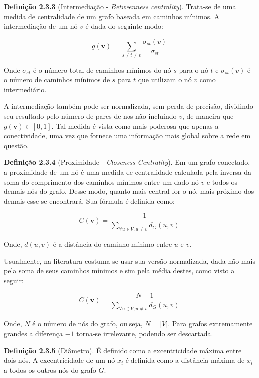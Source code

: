 \documentclass[12pt]{article}
\begin{document}
\noindent \textbf{Definição 2.3.3} (Intermediação - \textit{Betweenness centrality}). Trata-se de uma medida de centralidade de um grafo baseada em caminhos mínimos. A intermediação de um nó $v$ é dada do seguinte modo: 

\begin{equation}
    g(\bm v) = \sum_{s \neq t \neq v} \frac{\sigma_{st}(v)}{\sigma_{st}}
\end{equation}

Onde $\sigma_{st}$ é o número total de caminhos mínimos do nó $s$ para o nó $t$ e $\sigma_{st}(v)$ é o número de caminhos mínimos de $s$ para $t$ que utilizam o nó $v$ como intermediário.

 A intermediação também pode ser normalizada, sem perda de precisão, dividindo seu resultado pelo número de pares de nós não incluindo $v$, de maneira que $g(\bm v) \in [0,1]$. Tal medida é vista como mais poderosa que apenas a conectividade, uma vez que fornece uma informação mais global sobre a rede em questão.

\noindent \textbf{Definição 2.3.4} (Proximidade - \textit{Closeness Centrality}). Em um grafo conectado, a proximidade de um nó é uma medida de centralidade calculada pela inversa da soma do comprimento dos caminhos mínimos entre um dado nó $v$ e todos os demais nós do grafo. Desse modo, quanto mais central for o nó, mais próximo dos demais esse se encontrará. Sua fórmula é definida como:

\begin{equation}
    C(\bm v) = \frac{1}{\sum_{\forall u \in V, u\neq v}d_G(u,v)}
\end{equation}

Onde, $d(u,v)$ é a distância do caminho mínimo entre $u$ e $v$.

Usualmente, na literatura costuma-se usar sua versão normalizada, dada não mais pela soma de seus caminhos mínimos e sim pela média destes, como visto a seguir:

\begin{equation}
    C(\bm v) = \frac{N - 1}{\sum_{\forall u \in V, u\neq v}d_G(u,v)}
\end{equation}

Onde, $N$ é o número de nós do grafo, ou seja, $N = |V|$. Para grafos extremamente grandes a diferença $- 1$ torna-se irrelevante, podendo ser descartada.

\noindent \textbf{Definição 2.3.5} (Diâmetro). É definido como a excentricidade máxima entre dois nós. A excentricidade de um nó $x_i$ é definida como a distância máxima de $x_i$ a todos os outros nós do grafo $G$.
\end{document}
